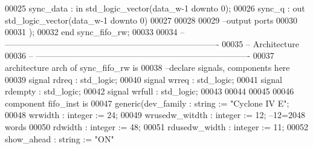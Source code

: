 \begin{DoxyCode}
00025         \textcolor{vhdlchar}{sync_data} \textcolor{vhdlchar}{:} \textcolor{keywordflow}{in} \textcolor{comment}{std\_logic\_vector}\textcolor{vhdlchar}{(}\textcolor{vhdlchar}{data_w}\textcolor{vhdlchar}{-}\textcolor{vhdllogic}{}\textcolor{vhdllogic}{1} \textcolor{keywordflow}{downto} \textcolor{vhdllogic}{}\textcolor{vhdllogic}{0}\textcolor{vhdlchar}{)};
00026         \textcolor{vhdlchar}{sync_q}    \textcolor{vhdlchar}{:} \textcolor{keywordflow}{out} \textcolor{comment}{std\_logic\_vector}\textcolor{vhdlchar}{(}\textcolor{vhdlchar}{data_w}\textcolor{vhdlchar}{-}\textcolor{vhdllogic}{}\textcolor{vhdllogic}{1} \textcolor{keywordflow}{downto} \textcolor{vhdllogic}{}\textcolor{vhdllogic}{0}\textcolor{vhdlchar}{)}
00027         
00028 
00029 \textcolor{keyword}{        --output ports }
00030         
00031         \textcolor{vhdlchar}{)};
00032 \textcolor{keywordflow}{end} \textcolor{vhdlchar}{sync\_fifo\_rw};
00033 
00034 \textcolor{keyword}{-- ----------------------------------------------------------------------------}
00035 \textcolor{keyword}{-- Architecture}
00036 \textcolor{keyword}{-- ----------------------------------------------------------------------------}
00037 \textcolor{keywordflow}{architecture} arch \textcolor{keywordflow}{of} sync_fifo_rw is
00038 \textcolor{keyword}{--declare signals,  components here}
00039 \textcolor{keywordflow}{signal} \textcolor{vhdlchar}{rdreq}    \textcolor{vhdlchar}{:} \textcolor{comment}{std\_logic};
00040 \textcolor{keywordflow}{signal} \textcolor{vhdlchar}{wrreq}    \textcolor{vhdlchar}{:} \textcolor{comment}{std\_logic};
00041 \textcolor{keywordflow}{signal} \textcolor{vhdlchar}{rdempty}  \textcolor{vhdlchar}{:} \textcolor{comment}{std\_logic};
00042 \textcolor{keywordflow}{signal} \textcolor{vhdlchar}{wrfull}   \textcolor{vhdlchar}{:} \textcolor{comment}{std\_logic};
00043 
00044 
00045 
00046 \textcolor{keywordflow}{component} fifo_inst \textcolor{keywordflow}{is}
00047   \textcolor{keywordflow}{generic}(dev_family         : \textcolor{comment}{string}  := \textcolor{keyword}{"Cyclone IV E"};
00048           wrwidth         : \textcolor{comment}{integer} := \textcolor{vhdllogic}{}\textcolor{vhdllogic}{24};
00049           wrusedw_witdth  : \textcolor{comment}{integer} := \textcolor{vhdllogic}{}\textcolor{vhdllogic}{12}; \textcolor{keyword}{--12=2048 words }
00050           rdwidth         : \textcolor{comment}{integer} := \textcolor{vhdllogic}{}\textcolor{vhdllogic}{48};
00051           rdusedw_width   : \textcolor{comment}{integer} := \textcolor{vhdllogic}{}\textcolor{vhdllogic}{11};
00052           show_ahead      : \textcolor{comment}{string}  := \textcolor{keyword}{"ON"}

\end{DoxyCode}
